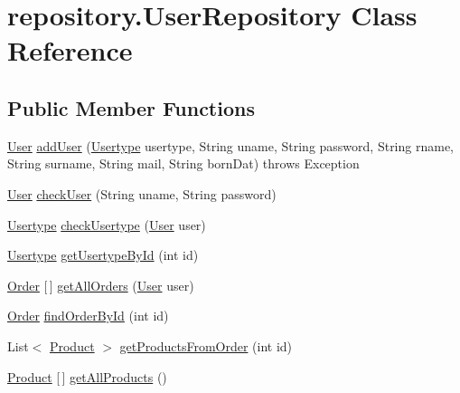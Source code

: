 \hypertarget{classrepository_1_1_user_repository}{}\section{repository.\+User\+Repository Class Reference}
\label{classrepository_1_1_user_repository}
\subsection*{Public Member Functions}
\begin{DoxyCompactItemize}
\item 
\mbox{\hyperlink{classentity_1_1_user}{User}} \mbox{\hyperlink{classrepository_1_1_user_repository_a56e9773c71b3fc00aa6589ebad411a87}{add\+User}} (\mbox{\hyperlink{classentity_1_1_usertype}{Usertype}} usertype, String uname, String password, String rname, String surname, String mail, String born\+Dat)  throws Exception 
\item 
\mbox{\hyperlink{classentity_1_1_user}{User}} \mbox{\hyperlink{classrepository_1_1_user_repository_adf10692a176bf2819fb70895530ef086}{check\+User}} (String uname, String password)
\item 
\mbox{\hyperlink{classentity_1_1_usertype}{Usertype}} \mbox{\hyperlink{classrepository_1_1_user_repository_a8e4a797c0eb806d34793295af70fd281}{check\+Usertype}} (\mbox{\hyperlink{classentity_1_1_user}{User}} user)
\item 
\mbox{\hyperlink{classentity_1_1_usertype}{Usertype}} \mbox{\hyperlink{classrepository_1_1_user_repository_a7da3f6411186e8169f5730638e6a4032}{get\+Usertype\+By\+Id}} (int id)
\item 
\mbox{\hyperlink{classentity_1_1_order}{Order}} \mbox{[}$\,$\mbox{]} \mbox{\hyperlink{classrepository_1_1_user_repository_a56980daa937375f2c13ceb712a08aace}{get\+All\+Orders}} (\mbox{\hyperlink{classentity_1_1_user}{User}} user)
\item 
\mbox{\hyperlink{classentity_1_1_order}{Order}} \mbox{\hyperlink{classrepository_1_1_user_repository_a487c490af80c0a94477bfcfdbe7d288f}{find\+Order\+By\+Id}} (int id)
\item 
List$<$ \mbox{\hyperlink{classentity_1_1_product}{Product}} $>$ \mbox{\hyperlink{classrepository_1_1_user_repository_a413de9a5357ced95cfe6524c47b98bee}{get\+Products\+From\+Order}} (int id)
\item 
\mbox{\hyperlink{classentity_1_1_product}{Product}} \mbox{[}$\,$\mbox{]} \mbox{\hyperlink{classrepository_1_1_user_repository_a91aaaa79a8c1be15fc6111a9467c981e}{get\+All\+Products}} ()
\end{DoxyCompactItemize}


